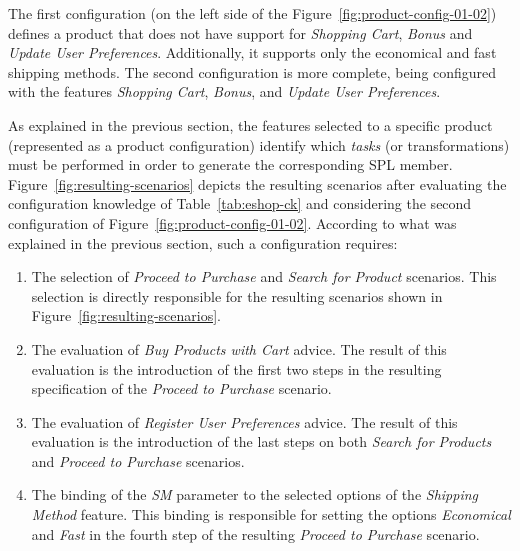 \documentclass{sig-alternate}
\begin{document}
The first configuration (on the left side of the
Figure~\ref{fig:product-config-01-02}) defines a product that does not have support for
\emph{Shopping Cart}, \emph{Bonus} and \emph{Update User Preferences}.
Additionally, it supports only the economical and fast shipping methods. The
second configuration is more complete, being configured with the features
\emph{Shopping Cart}, \emph{Bonus}, and \emph{Update User Preferences}.

As explained in the previous section, the features selected to a specific product
(represented as a product configuration) identify which \emph{tasks} (or
transformations) must be performed in order to generate the corresponding SPL
member. 
Figure~\ref{fig:resulting-scenarios} depicts the resulting scenarios after evaluating the configuration knowledge of
Table~\ref{tab:eshop-ck} and considering the second configuration of
Figure~\ref{fig:product-config-01-02}. According to what was explained in the
previous section, such a configuration requires: 

\begin{enumerate} 
 \item The selection of \emph{Proceed to Purchase} and \emph{Search for Product} scenarios. This selection is directly responsible 
for the resulting scenarios shown in Figure~\ref{fig:resulting-scenarios}. 
  
 \item The evaluation of \emph{Buy Products with Cart} advice. The result of this evaluation is the introduction of the 
first two steps in the resulting specification of the \emph{Proceed to Purchase} scenario. 
 
 \item The evaluation of \emph{Register User Preferences} advice. The result of this evaluation is the introduction of the last steps on both \emph{Search for Products} and \emph{Proceed to
Purchase} scenarios.

 \item The binding of the \emph{SM} parameter to the selected options of the \emph{Shipping Method} feature. This binding is responsible for 
 setting the options \emph{Economical} and \emph{Fast} in the fourth step of the
 resulting \emph{Proceed to Purchase} scenario.

\end{enumerate}
\end{document}
